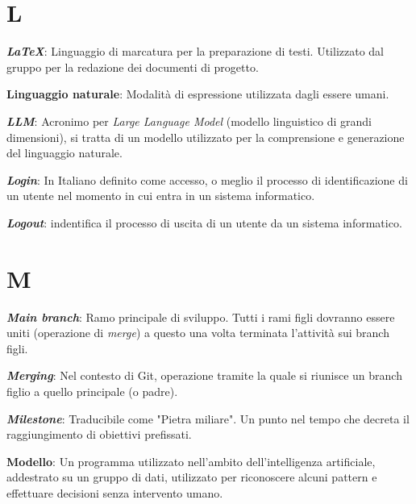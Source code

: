 \documentclass[5pt]{article}
\begin{document}
\section*{L}
\begin{flushleft}
	
\textbf{\textit{LaTeX}}: Linguaggio di marcatura per la preparazione di testi. Utilizzato dal gruppo per la redazione dei documenti di progetto.\newline
	
\textbf{Linguaggio naturale}: Modalità di espressione utilizzata dagli essere umani.\newline

\textbf{\textit{LLM}}: Acronimo per \textit{Large Language Model} (modello linguistico di grandi dimensioni), si tratta di un modello utilizzato per la comprensione e generazione del linguaggio naturale.\newline

\textbf{\textit{Login}}: In Italiano definito come accesso, o meglio il processo di identificazione di un utente nel momento in cui entra in un sistema informatico. \newline

\textbf{\textit{Logout}}: indentifica il processo di uscita di un utente da un sistema informatico.

\end{flushleft}

\pagebreak

\section*{M}
\begin{flushleft}
	
\textbf{\textit{Main branch}}: Ramo principale di sviluppo. Tutti i rami figli dovranno essere uniti (operazione di \textit{merge}) a questo una volta terminata l'attività sui branch figli.\newline

\textbf{\textit{Merging}}: Nel contesto di Git, operazione tramite la quale si riunisce un branch figlio a quello principale (o padre).\newline

\textbf{\textit{Milestone}}: Traducibile come "Pietra miliare". Un punto nel tempo che decreta il raggiungimento di obiettivi prefissati.\newline
	
\textbf{Modello}: Un programma utilizzato nell'ambito dell'intelligenza artificiale, addestrato su un gruppo di dati, utilizzato per riconoscere alcuni pattern e effettuare decisioni senza intervento umano.

\end{flushleft}
\end{document}
